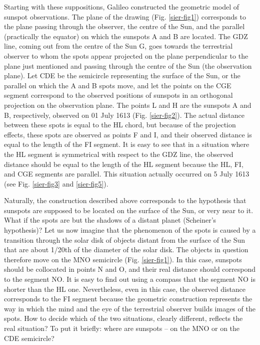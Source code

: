 \begin{artengenv}
Starting with these suppositions, Galileo constructed the geometric model of sunspot observations. The plane of the
drawing (Fig. \ref{sier-fig1}) corresponds to the plane passing through the observer, the centre of the Sun, and the parallel
(practically the equator) on which the sunspots A and B are located. The GDZ line, coming out from the centre of the
Sun G, goes towards the terrestrial observer to whom the spots appear projected on the plane perpendicular to the plane
just mentioned and passing through the centre of the Sun (the observation plane). Let CDE be the semicircle
representing the surface of the Sun, or the parallel on which the A and B spots move, and let the points on the CGE
segment correspond to the observed positions of sunspots in an orthogonal projection on the observation plane. The
points L and H are the sunspots A and B, respectively, observed on 01 July 1613 (Fig. \ref{sier-fig2}). The actual distance between
these spots is equal to the HL chord, but because of the projection effects, these spots are observed as points F and
I, and their observed distance is equal to the length of the FI segment. It is easy to see that in a situation where
the HL segment is symmetrical with respect to the GDZ line, the observed distance should be equal to the length of the
HL segment because the HL, FI, and CGE segments are parallel. This situation actually occurred on 5 July 1613 (see Fig.
\ref{sier-fig3} and \ref{sier-fig5}).

Naturally, the construction described above corresponds to the hypothesis that sunspots are supposed to be located on
the surface of the Sun, or very near to it. What if the spots are but the shadows of a distant planet (Scheiner’s
hypothesis)? Let us now imagine that the phenomenon of the spots is caused by a transition through the solar disk of
objects distant from the surface of the Sun that are about 1/20th of the diameter of the solar disk. The objects in
question therefore move on the MNO semicircle (Fig. \ref{sier-fig1}). In this case, sunspots should be collocated in points N and O,
and their real distance should correspond to the segment NO. It is easy to find out using a compass that the segment NO
is shorter than the HL one. Nevertheless, even in this case, the observed distance corresponds to the FI segment
because the geometric construction represents the way in which the mind and the eye of the terrestrial observer builds
images of the spots. How to decide which of the two situations, clearly different, reflects the real situation? To put
it briefly: where are sunspots -- on the MNO or on the CDE semicircle?


\end{artengenv}
